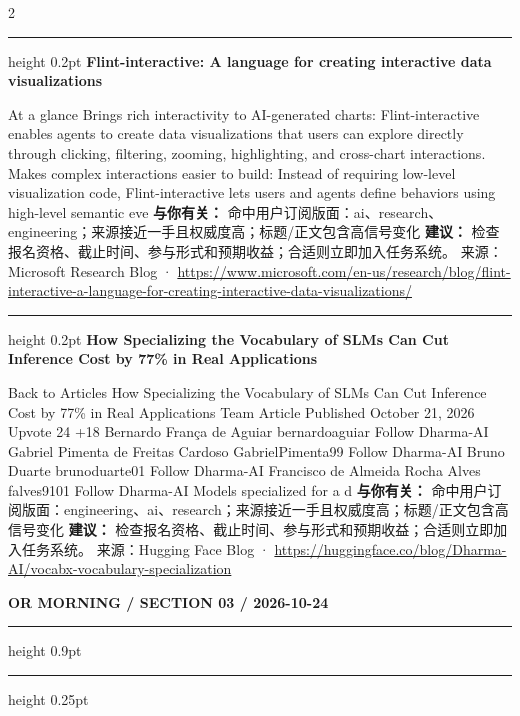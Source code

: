 \documentclass[10.5pt]{ctexart}
\begin{document}
\begin{multicols}{2}
\vspace{2mm}
\hrule height 0.2pt
\vspace{2mm}
{\large\bfseries Flint-interactive: A language for creating interactive data visualizations}\par
At a glance Brings rich interactivity to AI-generated charts: Flint-interactive enables agents to create data visualizations that users can explore directly through clicking, filtering, zooming, highlighting, and cross-chart interactions. Makes complex interactions easier to build: Instead of requiring low-level visualization code, Flint-interactive lets users and agents define behaviors using high-level semantic eve
\textbf{与你有关：} 命中用户订阅版面：ai、research、engineering；来源接近一手且权威度高；标题/正文包含高信号变化
\textbf{建议：} 检查报名资格、截止时间、参与形式和预期收益；合适则立即加入任务系统。
{\footnotesize\color{ormuted} 来源：Microsoft Research Blog · \url{https://www.microsoft.com/en-us/research/blog/flint-interactive-a-language-for-creating-interactive-data-visualizations/}}
\vspace{2mm}
\hrule height 0.2pt
\vspace{2mm}
{\large\bfseries How Specializing the Vocabulary of SLMs Can Cut Inference Cost by 77\% in Real Applications}\par
Back to Articles How Specializing the Vocabulary of SLMs Can Cut Inference Cost by 77\% in Real Applications Team Article Published October 21, 2026 Upvote 24 +18 Bernardo França de Aguiar bernardoaguiar Follow Dharma-AI Gabriel Pimenta de Freitas Cardoso GabrielPimenta99 Follow Dharma-AI Bruno Duarte brunoduarte01 Follow Dharma-AI Francisco de Almeida Rocha Alves falves9101 Follow Dharma-AI Models specialized for a d
\textbf{与你有关：} 命中用户订阅版面：engineering、ai、research；来源接近一手且权威度高；标题/正文包含高信号变化
\textbf{建议：} 检查报名资格、截止时间、参与形式和预期收益；合适则立即加入任务系统。
{\footnotesize\color{ormuted} 来源：Hugging Face Blog · \url{https://huggingface.co/blog/Dharma-AI/vocabx-vocabulary-specialization}}
\end{multicols}
\newpage
{\small\bfseries OR MORNING / SECTION 03 / 2026-10-24}
\vspace{2mm}
\hrule height 0.9pt
\vspace{1.5mm}
\hrule height 0.25pt
\vspace{4mm}
\end{document}
